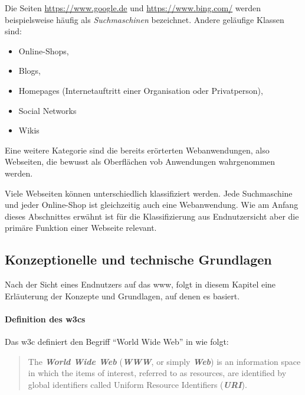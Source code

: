         Die Seiten \url{https://www.google.de} und \url{https://www.bing.com/}
        werden beispielsweise häufig als \textit{Suchmaschinen} bezeichnet.
        Andere geläufige Klassen sind:

        \begin{itemize}
            \item Online-Shops,
            \item Blogs,
            \item Homepages (Internetauftritt einer Organisation oder Privatperson),
            \item Social Networks
            \item Wikis
        \end{itemize}

        Eine weitere Kategorie sind die bereits erörterten Webanwendungen,
        also Webseiten, die bewusst als Oberflächen vob Anwendungen wahrgenommen werden.

        Viele Webseiten können unterschiedlich klassifiziert werden.
        Jede Suchmaschine und jeder Online-Shop ist gleichzeitig auch eine
        Webanwendung. Wie am Anfang dieses Abschnittes erwähnt ist für die
        Klassifizierung aus Endnutzersicht aber die primäre Funktion einer Webseite
        relevant.

    \subsection{Konzeptionelle und technische Grundlagen}
        Nach der Sicht eines Endnutzers auf das \gls{www},
        folgt in diesem Kapitel eine Erläuterung der Konzepte und Grundlagen,
        auf denen es basiert.

        \paragraph*{Definition des \glspl{w3c}}
        Das \gls{w3c} definiert den Begriff "`World Wide Web"' in \cite{w3c:wwwArch} wie folgt:

        \begin{quote}
            The \textit{\textbf{World Wide Web}} (\textit{\textbf{WWW}}, or simply \textit{\textbf{Web}})
            is an information space in which the items of interest, referred to as resources,
            are identified by global identifiers called Uniform Resource Identifiers (\textit{\textbf{URI}}).
        \end{quote}

